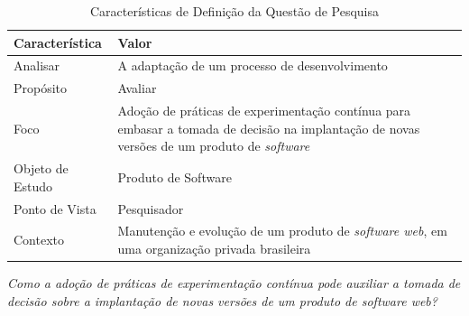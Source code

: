 \begin{table}[h!]
\centering
    \caption{Características de Definição da Questão de Pesquisa}
        \begin{tabular}{|p{4cm}|p{10cm}|}
            \hline
            \textbf{Característica} & \textbf{Valor} \\
            \hline
            Analisar & A adaptação de um processo de desenvolvimento \\
            Propósito & Avaliar \\
            Foco & Adoção de práticas de experimentação contínua para embasar a tomada de decisão na implantação de novas versões de um produto de \textit{software} \\
            Objeto de Estudo & Produto de Software \\
            Ponto de Vista & Pesquisador \\
            Contexto & Manutenção e evolução de um produto de \textit{software web}, em uma organização privada brasileira \\
            \hline
        \end{tabular}
   
 


    \begin{center}
    \end{center}

    \label{tab:gqm}
\end{table}



\begin{center}
    \textit{Como a adoção de práticas de experimentação contínua pode auxiliar a tomada de decisão sobre a implantação de novas versões de um produto de software web?}   
\end{center}

